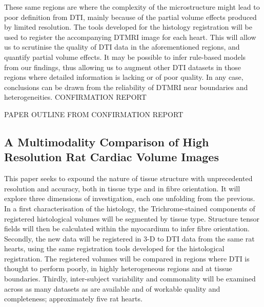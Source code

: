   These same regions are where the complexity of the microstructure might lead to poor definition from DTI, mainly because of the partial volume effects produced by limited resolution. The tools developed for the histology registration will be used to register the accompanying DTMRI image for each heart. This will allow us to scrutinise the quality of DTI data in the aforementioned regions, and quantify partial volume effects. It may be possible to infer rule-based models from our findings, thus allowing us to augment other DTI datasets in those regions where detailed information is lacking or of poor quality. In any case, conclusions can be drawn from the reliability of DTMRI near boundaries and heterogeneities.
CONFIRMATION REPORT

PAPER OUTLINE FROM CONFIRMATION REPORT
\subsection{A Multimodality Comparison of High Resolution Rat Cardiac Volume Images}
  This paper seeks to expound the nature of tissue structure with unprecedented resolution and accuracy, both in tissue type and in fibre orientation. It will explore three dimensions of investigation, each one unfolding from the previous. In a first characterisation of the histology, the Trichrome-stained components of registered histological volumes will be segmented by tissue type. Structure tensor fields will then be calculated within the myocardium to infer fibre orientation. Secondly, the new data will be registered in 3-D to DTI data from the same rat hearts, using the same registration tools developed for the histological registration. The registered volumes will be compared  in regions where DTI is thought to perform poorly, in highly heterogeneous regions and at tissue boundaries. Thirdly, inter-subject variability and commonality will be examined across as many datasets as are available and of workable quality and completeness; approximately five rat hearts.
  
